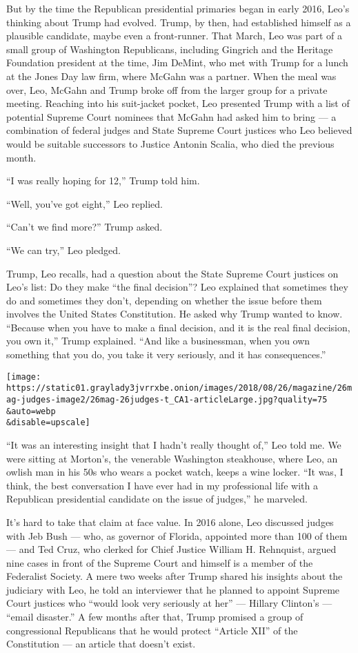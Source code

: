 But by the time the Republican presidential primaries began in early
2016, Leo's thinking about Trump had evolved. Trump, by then, had
established himself as a plausible candidate, maybe even a front-runner.
That March, Leo was part of a small group of Washington Republicans,
including Gingrich and the Heritage Foundation president at the time,
Jim DeMint, who met with Trump for a lunch at the Jones Day law firm,
where McGahn was a partner. When the meal was over, Leo, McGahn and
Trump broke off from the larger group for a private meeting. Reaching
into his suit-jacket pocket, Leo presented Trump with a list of
potential Supreme Court nominees that McGahn had asked him to bring ---
a combination of federal judges and State Supreme Court justices who Leo
believed would be suitable successors to Justice Antonin Scalia, who
died the previous month.

``I was really hoping for 12,'' Trump told him.

``Well, you've got eight,'' Leo replied.

``Can't we find more?'' Trump asked.

``We can try,'' Leo pledged.

Trump, Leo recalls, had a question about the State Supreme Court
justices on Leo's list: Do they make ``the final decision''? Leo
explained that sometimes they do and sometimes they don't, depending on
whether the issue before them involves the United States Constitution.
He asked why Trump wanted to know. ``Because when you have to make a
final decision, and it is the real final decision, you own it,'' Trump
explained. ``And like a businessman, when you own something that you do,
you take it very seriously, and it has consequences.''

\texttt{[image: https://static01.graylady3jvrrxbe.onion/images/2018/08/26/magazine/26mag-judges-image2/26mag-26judges-t\_CA1-articleLarge.jpg?quality=75\\\&auto=webp\\\&disable=upscale]}

``It was an interesting insight that I hadn't really thought of,'' Leo
told me. We were sitting at Morton's, the venerable Washington
steakhouse, where Leo, an owlish man in his 50s who wears a pocket
watch, keeps a wine locker. ``It was, I think, the best conversation I
have ever had in my professional life with a Republican presidential
candidate on the issue of judges,'' he marveled.

It's hard to take that claim at face value. In 2016 alone, Leo discussed
judges with Jeb Bush --- who, as governor of Florida, appointed more
than 100 of them --- and Ted Cruz, who clerked for Chief Justice William
H. Rehnquist, argued nine cases in front of the Supreme Court and
himself is a member of the Federalist Society. A mere two weeks after
Trump shared his insights about the judiciary with Leo, he told an
interviewer that he planned to appoint Supreme Court justices who
``would look very seriously at her'' --- Hillary Clinton's --- ``email
disaster.'' A few months after that, Trump promised a group of
congressional Republicans that he would protect ``Article XII'' of the
Constitution --- an article that doesn't exist.

